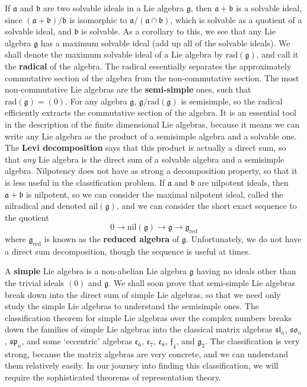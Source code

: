 If $\mathfrak{a}$ and $\mathfrak{b}$ are two solvable ideals in a Lie algebra $\mathfrak{g}$, then $\mathfrak{a} + \mathfrak{b}$ is a solvable ideal, since $(\mathfrak{a} + \mathfrak{b})/\mathfrak{b}$ is isomorphic to $\mathfrak{a}/(\mathfrak{a} \cap \mathfrak{b})$, which is solvable as a quotient of a solvable ideal, and $\mathfrak{b}$ is solvable. As a corollary to this, we see that any Lie algebra $\mathfrak{g}$ has a maximum solvable ideal (add up all of the solvable ideals). We shall denote the maximum solvable ideal of a Lie algebra by $\text{rad}(\mathfrak{g})$, and call it the {\bf radical} of the algebra. The radical essentially separates the approximately commutative section of the algebra from the non-commutative section. The most non-commutative Lie algebras are the {\bf semi-simple} ones, such that $\text{rad}(\mathfrak{g}) = (0)$. For any algebra $\mathfrak{g}$, $\mathfrak{g}/\text{rad}(\mathfrak{g})$ is semisimple, so the radical efficiently extracts the commutative section of the algebra. It is an essential tool in the description of the finite dimensional Lie algebras, because it means we can write any Lie algebra as the product of a semisimple algebra and a solvable one. The {\bf Levi decomposition} says that this product is actually a direct sum, so that {\it any} Lie algebra is the direct sum of a solvable algebra and a semisimple algebra. Nilpotency does not have as strong a decomposition property, so that it is less useful in the classification problem. If $\mathfrak{a}$ and $\mathfrak{b}$ are nilpotent ideals, then $\mathfrak{a} + \mathfrak{b}$ is nilpotent, so we can consider the maximal nilpotent ideal, called the nilradical and denoted $\text{nil}(\mathfrak{g})$, and we can consider the short exact sequence to the quotient
%
\[ 0 \to \text{nil}(\mathfrak{g}) \to \mathfrak{g} \to \mathfrak{g}_{\text{red}} \]
%
where $\mathfrak{g}_{\text{red}}$ is known as the {\bf reduced algebra} of $\mathfrak{g}$. Unfortunately, we do not have a direct sum decomposition, though the sequence is useful at times.

A {\bf simple} Lie algebra is a non-abelian Lie algebra $\mathfrak{g}$ having no ideals other than the trivial ideals $(0)$ and $\mathfrak{g}$. We shall soon prove that semi-simple Lie algebras break down into the direct sum of simple Lie algebras, so that we need only study the simple Lie algebras to understand the semisimple ones. The classification theorem for simple Lie algebras over the complex numbers breaks down the families of simple Lie algebras into the classical matrix algebras $\mathfrak{sl}_n$, $\mathfrak{so}_n$, $\mathfrak{sp}_n$, and some `eccentric' algebras $\mathfrak{e}_6$, $\mathfrak{e}_7$, $\mathfrak{e}_8$, $\mathfrak{f}_4$, and $\mathfrak{g}_2$. The classification is very strong, because the matrix algebras are very concrete, and we can understand them relatively easily. In our journey into finding this classification, we will require the sophisticated theorems of representation theory.



